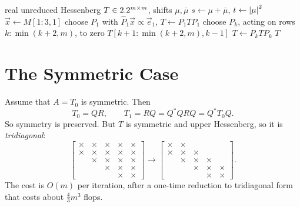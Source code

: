 \begin{algorithm}[H]
  \caption{Francis double-shift step.}
  \label{alg:francis}
  \begin{algorithmic}[1]
    \Require real unreduced Hessenberg $T \in 2.2^{m \times m}$, shifts $\mu, \bar{\mu}$
    \State $s \gets \mu + \bar{\mu}$, $t \gets \left\lvert \mu \right\rvert^2$
    \State $\vec{x} \gets M[1{:}3, 1]$ 
    \State choose $P_1$ with $\hat{P}_1\vec{x} \propto \vec{e}_1$, $T \gets P_1TP_1$ 
      \State choose $P_k$, acting on rows $k{:}\min(k + 2, m)$, to zero $T[k{+}1{:}\min(k + 2, m), k - 1]$
      \State $T \gets P_kTP_k$ 
    \EndFor
    \State \Return $T$ 
  \end{algorithmic}
\end{algorithm}

\section{The Symmetric Case}
\label{sec:symmetric-qr}

Assume that $A = T_0$ is symmetric. Then
\begin{equation}
  T_0 = QR, \qquad T_1 = RQ = Q^\ast QRQ = Q^\ast T_0Q.
\end{equation}
So symmetry is preserved. But $T$ is symmetric and upper Hessenberg, so it is \emph{tridiagonal}:
\begin{equation}
  \begin{bmatrix}
    \times & \times & \times & \times & \times \\
    \times & \times & \times & \times & \times \\
      & \times & \times & \times & \times \\
      &   & \times & \times & \times \\
      &   &   & \times & \times
  \end{bmatrix}
  \longrightarrow
  \begin{bmatrix}
    \times & \times &   &   &   \\
    \times & \times & \times &   &   \\
      & \times & \times & \times &   \\
      &   & \times & \times & \times \\
      &   &   & \times & \times
  \end{bmatrix}.
\end{equation}
The cost is $O(m)$ per iteration, after a one-time reduction to tridiagonal form that costs about $\frac{4}{3}m^3$ flops.

